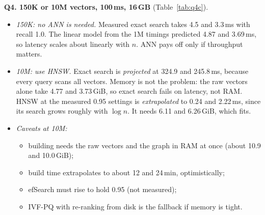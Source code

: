 \documentclass[10pt,twocolumn]{article}
\begin{document}

\textbf{Q4. 150K or 10M vectors, 100\,ms, 16\,GB} (Table~\ref{tab:q4c}).
\begin{itemize}
\item \emph{150K: no ANN is needed.} Measured exact search takes 4.5 and 3.3\,ms with recall 1.0.
  The linear model from the 1M timings predicted 4.87 and 3.69\,ms, so latency scales about
  linearly with $n$. ANN pays off only if throughput matters.
\item \emph{10M: use HNSW.} Exact search is \emph{projected} at 324.9 and 245.8\,ms, because
  every query scans all vectors. Memory is not the problem: the raw vectors alone take 4.77 and
  3.73\,GiB, so exact search fails on latency, not RAM. HNSW at the measured 0.95 settings is
  \emph{extrapolated} to 0.24 and 2.22\,ms, since its search grows roughly with $\log n$. It needs
  6.11 and 6.26\,GiB, which fits.
\item \emph{Caveats at 10M:}
  \begin{itemize}
  \item building needs the raw vectors and the graph in RAM at once (about 10.9 and 10.0\,GiB);
  \item build time extrapolates to about 12 and 24\,min, optimistically;
  \item efSearch must rise to hold 0.95 (not measured);
  \item IVF-PQ with re-ranking from disk is the fallback if memory is tight.
  \end{itemize}
\end{itemize}
\end{document}
